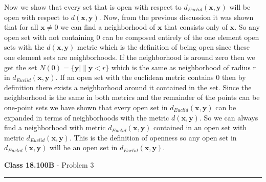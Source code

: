 \documentclass[11pt,reqno]{article}
\begin{document}
\indent Now we show that every set that is open with respect to $d_{Euclid}(\mathbf{x},\mathbf{y})$ will be open with respect to $d(\mathbf{x},\mathbf{y})$. Now, from the previous discussion it was shown that for all $\mathbf{x} \neq 0$ we can find a neighborhood of $\mathbf{x}$ that consists only of $\mathbf{x}$. So any open set with not containing $0$ can be composed entirely of the one element open sets with the $d(\mathbf{x},\mathbf{y})$ metric which is the definition of being open since these one element sets are neighborhoods. If the neighborhood is around zero then we get the set $N(0) = \{ \mathbf{y} | \| \mathbf{y} < r \}$ which is the same as neighborhood of radius r in $d_{Euclid}(\mathbf{x},\mathbf{y})$. If an open set with the euclidean metric contains 0 then by definition there exists a neighborhood around it contained in the set. Since the neighborhood is the same in both metrics and the remainder of the points can be one-point sets we have shown that every open set in $d_{Euclid}(\mathbf{x},\mathbf{y})$ can be expanded in terms of neighborhoods with the metric $d(\mathbf{x},\mathbf{y})$. So we can always find a neighborhood with metric  $d_{Euclid}(\mathbf{x},\mathbf{y})$ contained in an open set with metric $d_{Euclid}(\mathbf{x},\mathbf{y})$. This is the definition of openness so any open set in $d_{Euclid}(\mathbf{x},\mathbf{y})$ will be an open set in $d_{Euclid}(\mathbf{x},\mathbf{y})$.

\vspace{15pt}
\begin{flushleft} 
\textbf{Class 18.100B} - Problem 3\\
\rule{500pt}{1pt}\\
\end{flushleft} 
\end{document}
